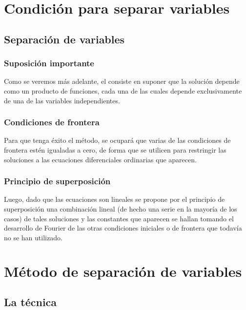 \documentclass[12pt]{beamer}
\begin{document}
\section{Condición para separar variables}
\subsection{Separación de variables}

\begin{frame}
\frametitle{Suposición importante}
Como se veremos más adelante, el  consiste en suponer que la solución depende como un producto de funciones, cada una de las cuales depende exclusivamente de una de las variables independientes.
\end{frame}
\begin{frame}
\frametitle{Condiciones de frontera}
Para que tenga éxito el método, se ocupará que varias de las condiciones de frontera estén igualadas a cero, de forma que se utilicen para restringir las soluciones a las ecuaciones diferenciales ordinarias que aparecen.
\end{frame}
\begin{frame}
\frametitle{Principio de superposición}
Luego, dado que las ecuaciones son lineales se propone por el principio de superposición una combinación lineal (de hecho una serie en la mayoría de los casos) de tales soluciones \pause y las constantes que aparecen se hallan tomando el desarrollo de Fourier de las otras condiciones iniciales o de frontera que todavía no se han utilizado.
\end{frame}


\section{Método de separación de variables}
\subsection{La técnica}
\end{document}

